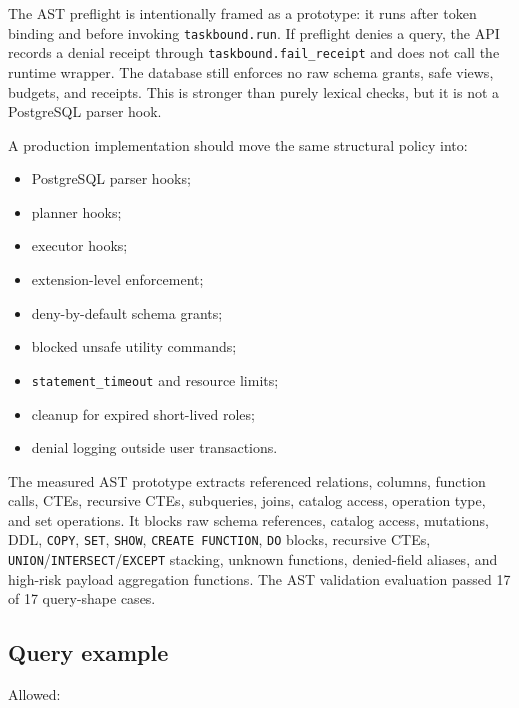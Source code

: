 \documentclass[journal]{IEEEtran}
\providecommand{\tightlist}{%
  \setlength{\itemsep}{0pt}\setlength{\parskip}{0pt}}
\begin{document}
The AST preflight is intentionally framed as a prototype: it runs after
token binding and before invoking \texttt{taskbound.run}. If preflight
denies a query, the API records a denial receipt through
\texttt{taskbound.fail\_receipt} and does not call the runtime wrapper.
The database still enforces no raw schema grants, safe views, budgets,
and receipts. This is stronger than purely lexical checks, but it is not
a PostgreSQL parser hook.

A production implementation should move the same structural policy into:

\begin{itemize}
\tightlist
\item
  PostgreSQL parser hooks;
\item
  planner hooks;
\item
  executor hooks;
\item
  extension-level enforcement;
\item
  deny-by-default schema grants;
\item
  blocked unsafe utility commands;
\item
  \texttt{statement\_timeout} and resource limits;
\item
  cleanup for expired short-lived roles;
\item
  denial logging outside user transactions.
\end{itemize}

The measured AST prototype extracts referenced relations, columns,
function calls, CTEs, recursive CTEs, subqueries, joins, catalog access,
operation type, and set operations. It blocks raw schema references,
catalog access, mutations, DDL, \texttt{COPY}, \texttt{SET},
\texttt{SHOW}, \texttt{CREATE\ FUNCTION}, \texttt{DO} blocks, recursive
CTEs, \texttt{UNION}/\texttt{INTERSECT}/\texttt{EXCEPT} stacking,
unknown functions, denied-field aliases, and high-risk payload
aggregation functions. The AST validation evaluation passed 17 of 17
query-shape cases.

\hypertarget{query-example}{%
\subsection{Query example}\label{query-example}}

Allowed:
\end{document}
